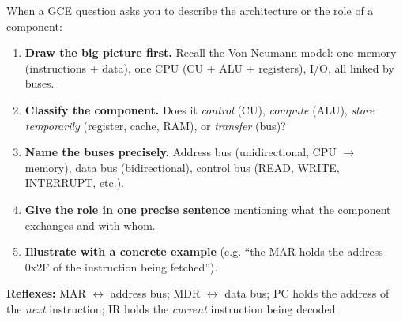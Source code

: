 \documentclass[11pt]{article}
\begin{document}
\begin{methode}
When a GCE question asks you to describe the architecture or the role of a component:
\begin{enumerate}
\item \textbf{Draw the big picture first.} Recall the Von Neumann model: one memory (instructions + data), one CPU (CU + ALU + registers), I/O, all linked by buses.
\item \textbf{Classify the component.} Does it \emph{control} (CU), \emph{compute} (ALU), \emph{store temporarily} (register, cache, RAM), or \emph{transfer} (bus)?
\item \textbf{Name the buses precisely.} Address bus (unidirectional, CPU $\rightarrow$ memory), data bus (bidirectional), control bus (READ, WRITE, INTERRUPT, etc.).
\item \textbf{Give the role in one precise sentence} mentioning what the component exchanges and with whom.
\item \textbf{Illustrate with a concrete example} (e.g. ``the MAR holds the address 0x2F of the instruction being fetched'').
\end{enumerate}
\textbf{Reflexes:} MAR $\leftrightarrow$ address bus; MDR $\leftrightarrow$ data bus; PC holds the address of the \emph{next} instruction; IR holds the \emph{current} instruction being decoded.
\end{methode}
\end{document}

